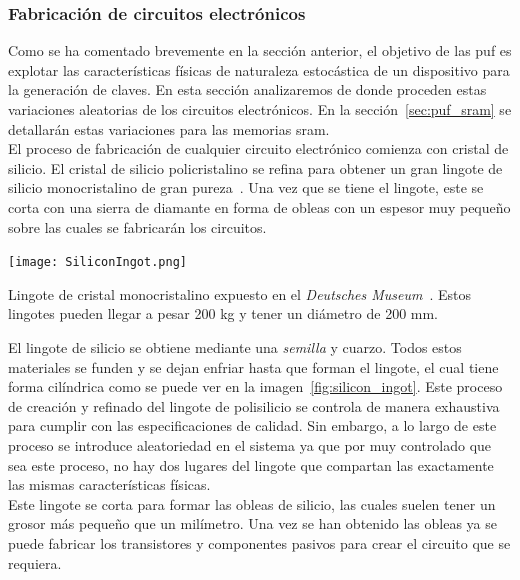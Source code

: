 \documentclass[spanish]{template/minim}
\begin{document}
\subsubsection{Fabricación de circuitos electrónicos}\label{sec:fabricacion}

Como se ha comentado brevemente en la sección anterior, el objetivo de las \gls{puf} es explotar las características físicas de naturaleza estocástica de un dispositivo para la generación de claves. En esta sección analizaremos de donde proceden estas variaciones aleatorias de los circuitos electrónicos. En la sección~\ref{sec:puf_sram} se detallarán estas variaciones para las memorias \gls{sram}.\\

El proceso de fabricación de cualquier circuito electrónico comienza con cristal de silicio. El cristal de silicio policristalino se refina para obtener un gran lingote de silicio monocristalino de gran pureza~. Una vez que se tiene el lingote, este se corta con una sierra de diamante en forma de obleas con un espesor muy pequeño sobre las cuales se fabricarán los circuitos.\\

\begin{marginfigure}
    \centering
    \texttt{[image: SiliconIngot.png]}
    \caption[Lingote de silicio monocristalino]{
        Lingote de cristal monocristalino expuesto en el \textit{Deutsches Museum}~\cite{silicon_crystal}. Estos lingotes pueden llegar a pesar 200 kg y tener un diámetro de 200 mm.\label{fig:silicon_ingot}}
\end{marginfigure}

El lingote de silicio se obtiene mediante una \textit{semilla} y cuarzo. Todos estos materiales se funden y se dejan enfriar hasta que forman el lingote, el cual tiene forma cilíndrica como se puede ver en la imagen~\ref{fig:silicon_ingot}. Este proceso de creación y refinado del lingote de polisilicio se controla de manera exhaustiva para cumplir con las especificaciones de calidad. Sin embargo, a lo largo de este proceso se introduce aleatoriedad en el sistema ya que por muy controlado que sea este proceso, no hay dos lugares del lingote que compartan las exactamente las mismas características físicas.\\

Este lingote se corta para formar las obleas de silicio, las cuales suelen tener un grosor más pequeño que un milímetro. Una vez se han obtenido las obleas ya se puede fabricar los transistores y componentes pasivos para crear el circuito que se requiera.\\
\end{document}
